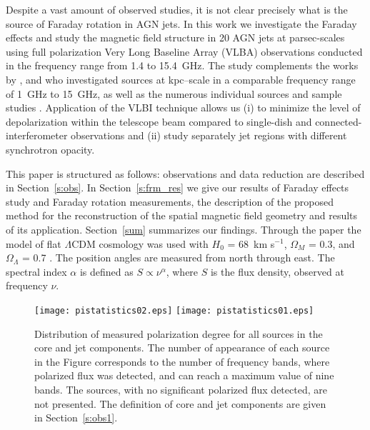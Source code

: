 \documentclass[a4paper,fleqn,usenatbib,useAMS]{mnras}
\begin{document}
Despite a vast amount of observed studies, it is not clear precisely what is the source of Faraday rotation in AGN jets.
In this work we investigate the Faraday effects and study the magnetic field structure in 20 AGN jets at parsec-scales using full polarization Very Long Baseline Array (VLBA) observations conducted in the frequency range from 1.4 to 15.4~GHz. 
The study complements the works by \citet{farnes_etal14}, \citet{2016A...586A.117P} and \citet{2016ApJ...825...59A} who investigated sources at kpc--scale in a comparable frequency range of 1~GHz to 15~GHz, as well as the numerous individual sources \citep[e.g.][]{asada_etal08,asada_etal10} and sample studies \citep[e.g.][]{zavala_taylor_03,osullivan_gabuzda_09,hovatta_etal12}.
Application of the VLBI technique allows us (i) to minimize the level of depolarization within the telescope beam compared to single-dish and connected-interferometer observations \citep[e.g.][]{osullivan_etal12} and (ii) study separately jet regions with different synchrotron opacity.

This paper is structured as follows: observations and data reduction are described in Section~\ref{s:obs}.
In Section~\ref{s:frm_res} we give our results of Faraday effects study and Faraday rotation measurements, the description of the proposed method for the reconstruction of the spatial magnetic field geometry and results of its application. 
Section~\ref{sum} summarizes our findings.
Through the paper the model of flat $\Lambda$CDM cosmology was used with $H_0$ = 68~km s$^{-1}$, $\Omega_M$ = 0.3, and $\Omega_{\Lambda}$ = 0.7 \citep[][]{planck_15}. 
The position angles are measured from north through east.
The spectral index $\alpha$ is defined as $S \propto \nu^{\alpha}$, where $S$ is the flux density, observed at frequency $\nu$.

\begin{figure}
 \centering
 \texttt{[image: pistatistics02.eps]}
 \texttt{[image: pistatistics01.eps]}\\
 \caption{Distribution of measured polarization degree for all sources in the core and jet components.  The number of appearance of each source in the Figure corresponds to the number of frequency bands, where polarized flux was detected, and can reach a maximum value of nine bands.
 The sources, with no significant polarized flux detected, are not presented. The definition 
 of core and jet components are given in Section~\ref{s:obs1}.
 \label{pistat}}
\end{figure}
\end{document}
